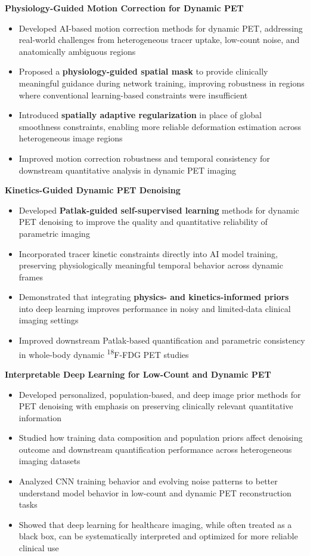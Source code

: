 \textbf{Physiology-Guided Motion Correction for Dynamic PET}
\begin{itemize}[leftmargin=*]
\item Developed AI-based motion correction methods for dynamic PET, addressing real-world challenges from heterogeneous tracer uptake, low-count noise, and anatomically ambiguous regions
\item Proposed a \textbf{physiology-guided spatial mask} to provide clinically meaningful guidance during network training, improving robustness in regions where conventional learning-based constraints were insufficient
\item Introduced \textbf{spatially adaptive regularization} in place of global smoothness constraints, enabling more reliable deformation estimation across heterogeneous image regions
\item Improved motion correction robustness and temporal consistency for downstream quantitative analysis in dynamic PET imaging
\end{itemize}

\textbf{Kinetics-Guided Dynamic PET Denoising}
\begin{itemize}[leftmargin=*]
\item Developed \textbf{Patlak-guided self-supervised learning} methods for dynamic PET denoising to improve the quality and quantitative reliability of parametric imaging
\item Incorporated tracer kinetic constraints directly into AI model training, preserving physiologically meaningful temporal behavior across dynamic frames
\item Demonstrated that integrating \textbf{physics- and kinetics-informed priors} into deep learning improves performance in noisy and limited-data clinical imaging settings
\item Improved downstream Patlak-based quantification and parametric consistency in whole-body dynamic \textsuperscript{18}F-FDG PET studies
\end{itemize}

\textbf{Interpretable Deep Learning for Low-Count and Dynamic PET}
\begin{itemize}[leftmargin=*]
\item Developed personalized, population-based, and deep image prior methods for PET denoising with emphasis on preserving clinically relevant quantitative information
\item Studied how training data composition and population priors affect denoising outcome and downstream quantification performance across heterogeneous imaging datasets
\item Analyzed CNN training behavior and evolving noise patterns to better understand model behavior in low-count and dynamic PET reconstruction tasks
\item Showed that deep learning for healthcare imaging, while often treated as a black box, can be systematically interpreted and optimized for more reliable clinical use
\end{itemize}

